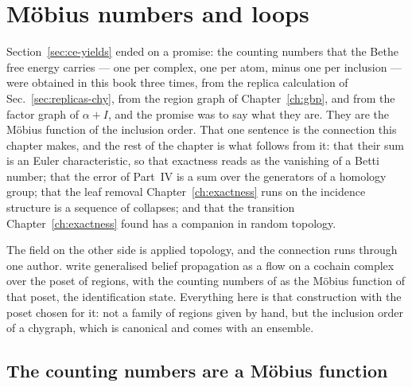 \chapter{M\"obius numbers and loops}
\label{ch:mobius}


Section~\ref{sec:ce-yields} ended on a promise: the counting numbers that the
Bethe free energy carries --- one per complex, one per atom, minus one per
inclusion --- were obtained in this book three times, from the replica
calculation of Sec.~\ref{sec:replicas-chy}, from the region graph of
Chapter~\ref{ch:gbp}, and from the factor graph of $\alpha+I$, and the
promise was to say what they are. They are the M\"obius function of the
inclusion order. That one sentence is the connection this chapter makes, and
the rest of the chapter is what follows from it: that their sum is an Euler
characteristic, so that exactness reads as the vanishing of a Betti number;
that the error of Part~IV is a sum over the generators of a homology group;
that the leaf removal Chapter~\ref{ch:exactness} runs on the incidence
structure is a sequence of collapses; and that the transition
Chapter~\ref{ch:exactness} found has a companion in random topology.

The field on the other side is applied topology, and the connection runs
through one author. \citet{peltre2019,peltre2020,peltre2021} write generalised belief
propagation as a flow on a cochain complex over the poset of regions, with
the counting numbers of \citet{yedidia2005} as the M\"obius function of that
poset, the identification \citet{pakzad2005} state. Everything here is that construction with the poset chosen for it: not
a family of regions given by hand, but the inclusion order of a chygraph,
which is canonical and comes with an ensemble.

\section{The counting numbers are a M\"obius function}
\label{sec:mb-mobius}

